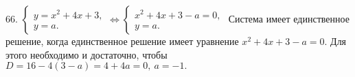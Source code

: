 66. $\begin{cases} y=x^2+4x+3,\\ y=a.\end{cases}\Leftrightarrow
\begin{cases} x^2+4x+3-a=0,\\ y=a.\end{cases}$ Система имеет единственное решение, когда единственное решение имеет уравнение $x^2+4x+3-a=0.$ Для этого необходимо и достаточно, чтобы $D=16-4(3-a)=4+4a=0,\ a=-1.$\\
